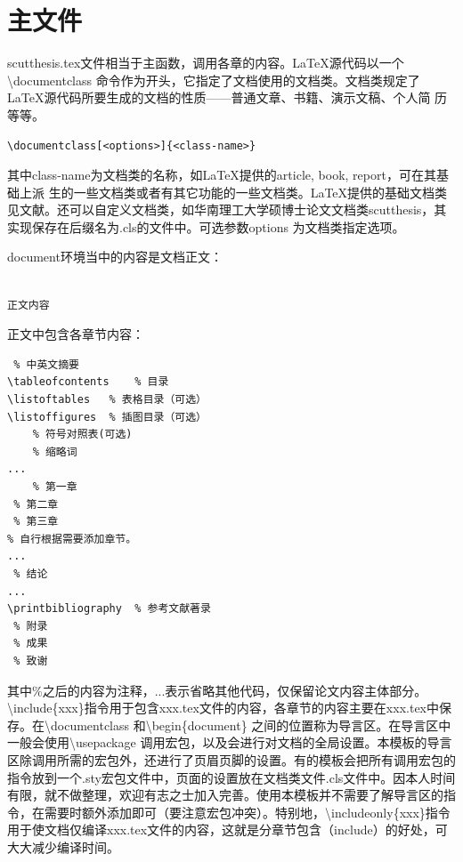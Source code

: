 \section{主文件}
scutthesis.tex文件相当于主函数，调用各章的内容。\LaTeX{}源代码以一个\textbackslash{}documentclass 命令作为开头，它指定了文档使用的文档类。文档类规定了\LaTeX{}源代码所要生成的文档的性质——普通文章、书籍、演示文稿、个人简
历等等。
\begin{lstlisting}
\documentclass[<options>]{<class-name>}
\end{lstlisting}
其中class-name为文档类的名称，如\LaTeX{}提供的article, book, report，可在其基础上派
生的一些文档类或者有其它功能的一些文档类。\LaTeX{}提供的基础文档类见文献\parencite{_c}。还可以自定义文档类，如华南理工大学硕博士论文文档类scutthesis，其实现保存在后缀名为.cls的文件中。可选参数options 为文档类指定选项。


document环境当中的内容是文档正文：
\begin{lstlisting}

正文内容

\end{lstlisting}
正文中包含各章节内容：
\begin{lstlisting}
 % 中英文摘要
\tableofcontents	% 目录
\listoftables	% 表格目录（可选）
\listoffigures	% 插图目录（可选）
	% 符号对照表(可选)
 	% 缩略词	
...
	% 第一章
 % 第二章
 % 第三章
% 自行根据需要添加章节。
...
 % 结论
...
\printbibliography	% 参考文献著录
 % 附录
 % 成果
 % 致谢
\end{lstlisting}
其中$\%$之后的内容为注释，...表示省略其他代码，仅保留论文内容主体部分。\textbackslash{}include\{xxx\}指令用于包含xxx.tex文件的内容，各章节的内容主要在xxx.tex中保存。在\textbackslash{}documentclass 和\textbackslash{}begin\{document\} 之间的位置称为导言区。在导言区中一般会使用\textbackslash{}usepackage 调用宏包，以及会进行对文档的全局设置。本模板的导言区除调用所需的宏包外，还进行了页眉页脚的设置。有的模板会把所有调用宏包的指令放到一个.sty宏包文件中，页面的设置放在文档类文件.cls文件中。因本人时间有限，就不做整理，欢迎有志之士加入完善。使用本模板并不需要了解导言区的指令，在需要时额外添加即可（要注意宏包冲突）。特别地，\textbackslash{}includeonly\{xxx\}指令用于使文档仅编译xxx.tex文件的内容，这就是分章节包含（include）的好处，可大大减少编译时间。

